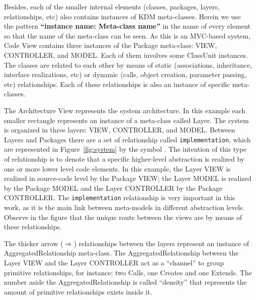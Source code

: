 Besides, each of the smaller internal elements (classes, packages, layers, relationships, etc) also contains instances of KDM meta-classes. Herein we use the pattern \textbf{``instance name: Meta-class name''} in the name of every element so that the name of the meta-class can be seen. As this is an MVC-based system, Code View contains three instances of the Package meta-class: VIEW, CONTROLLER, and MODEL. Each of them involves some ClassUnit instances. The classes are related to each other by means of static (associations, inheritance, interface realizations, etc) or dynamic (calls, object creation, parameter passing, etc) relationships. Each of these relationships is also an instance of specific meta-classes. 

The Architecture View represents the system architecture. In this example each smaller rectangle represents an instance of a meta-class called Layer. The system is organized in three layers:  VIEW, CONTROLLER, and MODEL. Between Layers and Packages there are a set of relationship called \texttt{implementation}, which are represented in Figure~\ref{fig:system} by the symbol \foobarMeu. The intention of this type of relationship is to denote that a specific higher-level abstraction is realized by one or more lower level code elements. In this example, the Layer VIEW is realized in source-code level by the Package VIEW; the Layer MODEL is realized by the Package MODEL and the Layer CONTROLLER by the Package CONTROLLER. The \texttt{implementation} relationship is very important in this work, as it is the main link between meta-models in different abstraction levels. Observe in the figure that the unique route between the views are by means of these relationships.
%

The thicker arrow ($\Rightarrow$) relationships between the layers represent an instance of AggregatedRelationship meta-class. The AggregatedRelationship between the Layer VIEW and the Layer CONTROLLER act as a ``channel'' to group primitive relationships, for instance: two Calls, one Creates and one Extends. The number aside the AggregatedRelationship is called ``density'' that represents the amount of primitive relationships exists inside it.

